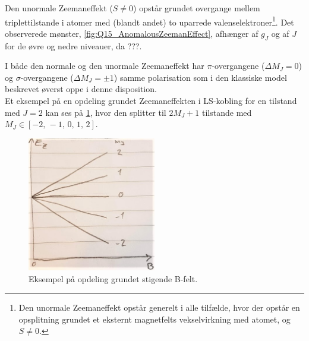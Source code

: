 Den \textsf{unormale Zeemaneffekt} ($S \ne 0$) opstår grundet overgange mellem triplettilstande i atomer med (blandt andet) to uparrede valenselektroner\footnote{Den unormale Zeemaneffekt opstår generelt i alle tilfælde, hvor der opstår en opsplitning grundet et eksternt magnetfelts vekselvirkning med atomet, og $S \ne 0$.}. Det observerede mønster, \cref{fig:Q15_AnomalousZeemanEffect}, afhænger af $g_J$ og af $J$ for de øvre og nedre niveauer, da ???.

I både den normale og den unormale Zeemaneffekt har $\pi$-overgangene ($\Delta M_J = 0$) og $\sigma$-overgangene ($\Delta M_J = \pm 1$) samme polarisation som i den klassiske model beskrevet øverst oppe i denne disposition.\\


Et eksempel på en opdeling grundet Zeemaneffekten i LS-kobling for en tilstand med $J = 2$ kan ses på \cref{fig:Q15_ZeemanWithLSCouplingSplittings}, hvor den splitter til $2M_J + 1$ tilstande med $M_J \in [-2,\, -1,\, 0,\, 1,\, 2]$.

\begin{figure}[!h]
    \centering
    \includegraphics[width=0.5\textwidth]{Q15/images/ZeemanEffectWithLSCouplingSplitting.jpg}
    \caption{Eksempel på opdeling grundet stigende B-felt.}
    \label{fig:Q15_ZeemanWithLSCouplingSplittings}
\end{figure}
